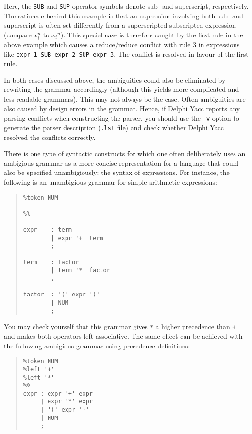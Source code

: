 \documentclass{article}
\begin{document}
Here, the \verb"SUB" and \verb"SUP" operator symbols denote sub- and
superscript, respectively. The rationale behind this example is that
an expression involving both sub- and superscript is often set differently
from a superscripted subscripted expression (compare $x_i^n$ to ${x_i}^n$).
This special case is therefore caught by the first rule in the above example
which causes a reduce/reduce conflict with rule 3 in expressions like
\verb"expr-1 SUB expr-2 SUP expr-3". The conflict is resolved in favour of
the first rule.

In both cases discussed above, the ambiguities could also be eliminated
by rewriting the grammar accordingly (although this yields more complicated
and less readable grammars). This may not always be the case. Often
ambiguities are also caused by design errors in the grammar. Hence, if
Delphi Yacc reports any parsing conflicts when constructing the parser, you
should use the \verb"-v" option to generate the parser description
(\verb".lst" file) and check whether Delphi Yacc resolved the conflicts correctly.

There is one type of syntactic constructs for which one often deliberately
uses an ambigious grammar as a more concise representation for a language
that could also be specified unambigiously: the syntax of expressions.
For instance, the following is an unambigious grammar for simple arithmetic
expressions:

\begin{quote}\begin{verbatim}
%token NUM

%%

expr    : term
        | expr '+' term
        ;

term    : factor
        | term '*' factor
        ;

factor  : '(' expr ')'
        | NUM
        ;
\end{verbatim}\end{quote}

You may check yourself that this grammar gives \verb"*" a higher precedence
than \verb"+" and makes both operators left-associative. The same effect can
be achieved with the following ambigious grammar using precedence definitions:

\begin{quote}\begin{verbatim}
%token NUM
%left '+'
%left '*'
%%
expr : expr '+' expr
     | expr '*' expr
     | '(' expr ')'
     | NUM
     ;
\end{verbatim}\end{quote}
\end{document}
